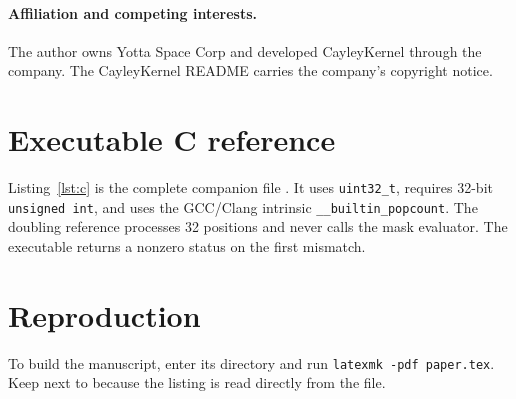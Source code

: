 \documentclass[11pt]{article}
\begin{document}
\paragraph{Affiliation and competing interests.}
The author owns Yotta Space Corp and developed CayleyKernel through the
company. The CayleyKernel README carries the company's copyright notice.

\appendix

\section{Executable C reference}
\label{app:c}
Listing~\ref{lst:c} is the complete companion file
. It uses \texttt{uint32\_t}, requires 32-bit
\texttt{unsigned int}, and uses the GCC/Clang intrinsic
\texttt{\_\_builtin\_popcount}. The doubling reference processes
32 positions and never calls the mask evaluator. The executable
returns a nonzero status on the first mismatch.


\section{Reproduction}
\label{app:reproduce}
To build the manuscript, enter its directory and run
\texttt{latexmk -pdf paper.tex}. Keep  next to
 because the listing is read directly from the file.
\end{document}
